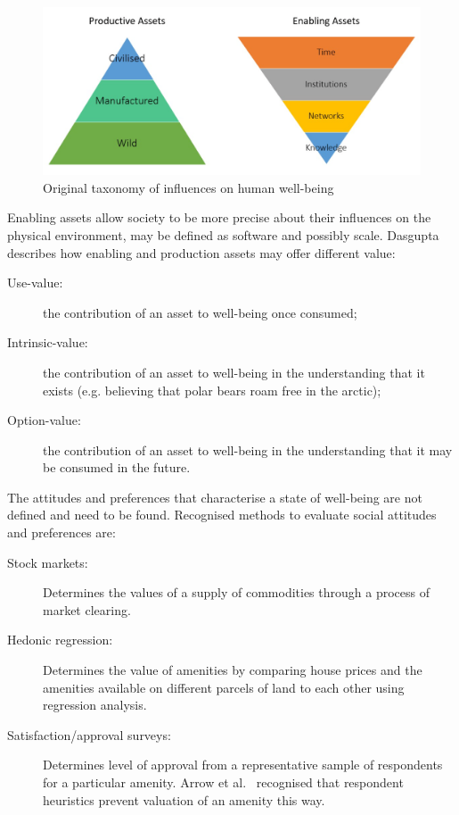 \documentclass[11pt, oneside]{book}   	%
\begin{document}
\begin{figure}[H]
\begin{center}
\includegraphics[width=1\textwidth]{productiveAssetTaxonomy.png}
\caption{Original taxonomy of influences on human well-being}
\label{Influences on well-being figure}
\end{center}
\end{figure}

Enabling assets allow society to be more precise about their influences on the physical environment, may be defined as software and possibly scale. Dasgupta~\cite{pd2} describes how enabling and production assets may offer different value:

\begin{description}
\item[Use-value:] the contribution of an asset to well-being once consumed;
\item[Intrinsic-value:] the contribution of an asset to well-being in the understanding that it exists (e.g. believing that polar bears roam free in the arctic);
\item[Option-value:] the contribution of an asset to well-being in the understanding that it may be consumed in the future.
\end{description}

The attitudes and preferences that characterise a state of well-being are not defined and need to be found. Recognised methods to evaluate social attitudes and preferences are:

\begin{description}
\item[Stock markets:] Determines the values of a supply of commodities through a process of market clearing.
\item[Hedonic regression:] Determines the value of amenities by comparing house prices and the amenities available on different parcels of land to each other using regression analysis.
\item[Satisfaction/approval surveys:] Determines level of approval from a representative sample of respondents for a particular amenity. Arrow et al.~\cite{kja1} recognised that respondent heuristics prevent valuation of an amenity this way.
\end{description}
\end{document}
